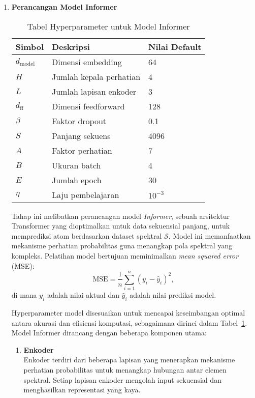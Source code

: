 \begin{enumerate}
    \item \textbf{Perancangan Model Informer} \\
    \begin{table}[h]
      \centering
      \small
      \caption{Tabel Hyperparameter untuk Model Informer}
      \label{tab:hyperparameter_informer}
      \begin{tabular}{p{3cm} p{5cm} p{3cm}}
        \toprule
        \textbf{Simbol} & \textbf{Deskripsi} & \textbf{Nilai Default} \\
        \midrule
        $d_{\text{model}}$ & Dimensi embedding & 64 \\
        $H$ & Jumlah kepala perhatian & 4 \\
        $L$ & Jumlah lapisan enkoder & 3 \\
        $d_{\text{ff}}$ & Dimensi feedforward & 128 \\
        $\beta$ & Faktor dropout & 0.1 \\
        $S$ & Panjang sekuens & 4096 \\
        $A$ & Faktor perhatian & 7 \\
        $B$ & Ukuran batch & 4 \\
        $E$ & Jumlah epoch & 30 \\
        $\eta$ & Laju pembelajaran & $10^{-3}$ \\
        \bottomrule
      \end{tabular}
    \end{table}
    Tahap ini melibatkan perancangan model \textit{Informer}, sebuah arsitektur Transformer yang dioptimalkan untuk data sekuensial panjang, untuk memprediksi atom berdasarkan dataset spektral \(\mathcal{S}\). Model ini memanfaatkan mekanisme perhatian probabilitas guna menangkap pola spektral yang kompleks. Pelatihan model bertujuan meminimalkan \textit{mean squared error} (MSE):
    \[
    \text{MSE} = \frac{1}{n} \sum_{i=1}^n (y_i - \hat{y}_i)^2,
    \]
    di mana \(y_i\) adalah nilai aktual dan \(\hat{y}_i\) adalah nilai prediksi model.

    Hyperparameter model disesuaikan untuk mencapai keseimbangan optimal antara akurasi dan efisiensi komputasi, sebagaimana dirinci dalam Tabel~\ref{tab:hyperparameter_informer}.
    Model Informer dirancang dengan beberapa komponen utama:
    \begin{enumerate}
      \item \textbf{Enkoder} \\
      Enkoder terdiri dari beberapa lapisan yang menerapkan mekanisme perhatian probabilitas untuk menangkap hubungan antar elemen spektral. Setiap lapisan enkoder mengolah input sekuensial dan menghasilkan representasi yang kaya.


\end{enumerate}
\end{enumerate}
